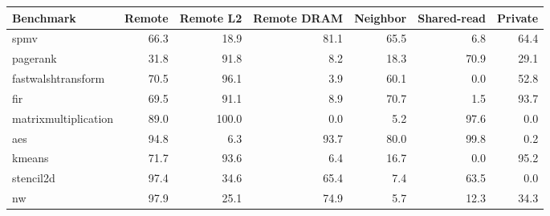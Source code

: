 \begin{tabular}{lrrrrrr}
\toprule
Benchmark & Remote & Remote L2 & Remote DRAM & Neighbor & Shared-read & Private \\
\midrule
spmv & 66.3 & 18.9 & 81.1 & 65.5 & 6.8 & 64.4 \\
pagerank & 31.8 & 91.8 & 8.2 & 18.3 & 70.9 & 29.1 \\
fastwalshtransform & 70.5 & 96.1 & 3.9 & 60.1 & 0.0 & 52.8 \\
fir & 69.5 & 91.1 & 8.9 & 70.7 & 1.5 & 93.7 \\
matrixmultiplication & 89.0 & 100.0 & 0.0 & 5.2 & 97.6 & 0.0 \\
aes & 94.8 & 6.3 & 93.7 & 80.0 & 99.8 & 0.2 \\
kmeans & 71.7 & 93.6 & 6.4 & 16.7 & 0.0 & 95.2 \\
stencil2d & 97.4 & 34.6 & 65.4 & 7.4 & 63.5 & 0.0 \\
nw & 97.9 & 25.1 & 74.9 & 5.7 & 12.3 & 34.3 \\
\bottomrule
\end{tabular}
